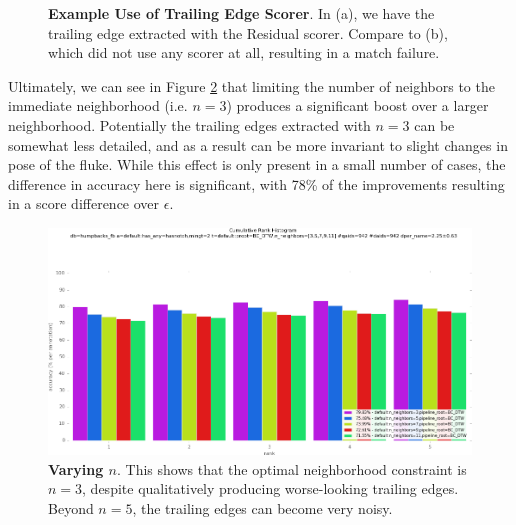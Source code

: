 \begin{figure}[t]%
\centering
{}
\newline
{}
\caption{\textbf{Example Use of Trailing Edge Scorer}. In (a), we have the trailing edge extracted with the Residual scorer. Compare to (b), which did not use any scorer at all, resulting in a match failure.}
\label{fig:dis_te_use}
\end{figure}




Ultimately, we can see in Figure \ref{fig:vary_neighbors} that limiting the number of neighbors to the immediate neighborhood (i.e. $n = 3$) produces a significant boost over a larger neighborhood.
Potentially the trailing edges extracted with $n = 3$ can be somewhat less detailed, and as a result can be more invariant to slight changes in pose of the fluke.
While this effect is only present in a small number of cases, the difference in accuracy here is significant, with 78\% of the improvements resulting in a score difference over $\epsilon$.

\begin{figure}[t]%
\centering
\includegraphics[width=1\textwidth]{../images/results/vary_neighbors.png}
\caption{\textbf{Varying $n$}. This shows that the optimal neighborhood constraint is $n = 3$, despite qualitatively producing worse-looking trailing edges. Beyond $n = 5$, the trailing edges can become very noisy.}
\label{fig:vary_neighbors}
\end{figure}

